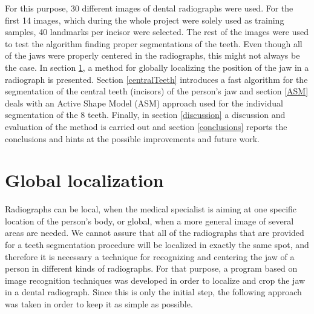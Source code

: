 \documentclass[a4paper,11pt,twoside]{article}
\begin{document}
For this purpose, 30 different images of dental radiographs were used. For the first 14 images, which during the whole project were solely used as training samples, 40 landmarks per incisor were selected. The rest of the images were used to test the algorithm finding proper segmentations of the teeth. Even though all of the jaws were properly centered in the radiographs, this might not always be the case. In section \textsection\ref{global}, a method for globally localizing the position of the jaw in a radiograph is presented. Section \textsection\ref{centralTeeth} introduces a fast algorithm for the segmentation of the central teeth (incisors) of the person's jaw and section \textsection\ref{ASM} deals with an Active Shape Model (ASM) approach used for the individual segmentation of the 8 teeth. Finally, in section \textsection\ref{discussion} a discussion and evaluation of the method is carried out and section \textsection\ref{conclusions} reports the conclusions and hints at the possible improvements and future work.




\section{Global localization}\label{global}

Radiographs can be local, when the medical specialist is aiming at one specific location of the person's body, or global, when a more general image of several areas are needed. We cannot assure that all of the radiographs that are provided for a teeth segmentation procedure will be localized in exactly the same spot, and therefore it is necessary a technique for recognizing and centering the jaw of a person in different kinds of radiographs. For that purpose, a program based on image recognition techniques was developed in order to localize and crop the jaw in a dental radiograph. Since this is only the initial step, the following approach was taken in order to keep it as simple as possible.
\end{document}
